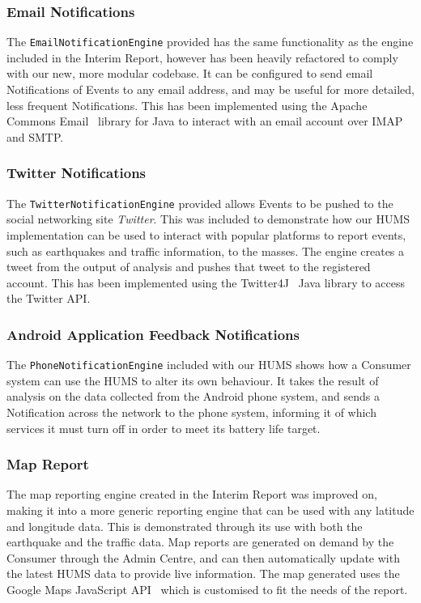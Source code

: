 \documentclass[10pt,a4paper]{article}
\begin{document}
\subsubsection{Email Notifications}
The \texttt{EmailNotificationEngine} provided has the same functionality as the engine included in the Interim Report, however has been heavily refactored to comply with our new, more modular codebase. It can be configured to send email Notifications of Events to any email address, and may be useful for more detailed, less frequent Notifications. This has been implemented using the Apache Commons Email~\cite{ac_email} library for Java to interact with an email account over IMAP and SMTP.

\subsubsection{Twitter Notifications}
The \texttt{TwitterNotificationEngine} provided allows Events to be pushed to the social networking site \emph{Twitter}. This was included to demonstrate how our HUMS implementation can be used to interact with popular platforms to report events, such as earthquakes and traffic information, to the masses. The engine creates a tweet from the output of analysis and pushes that tweet to the registered account. This has been implemented using the Twitter4J~\cite{twitter4j} Java library to access the Twitter API.

\subsubsection{Android Application Feedback Notifications}
The \texttt{PhoneNotificationEngine} included with our HUMS shows how a Consumer system can use the HUMS to alter its own behaviour. It takes the result of analysis on the data collected from the Android phone system, and sends a Notification across the network to the phone system, informing it of which services it must turn off in order to meet its battery life target.

\subsubsection{Map Report}
The map reporting engine created in the Interim Report was improved on, making it into a more generic reporting engine that can be used with any latitude and longitude data. This is demonstrated through its use with both the earthquake and the traffic data. Map reports are generated on demand by the Consumer through the Admin Centre, and can then automatically update with the latest HUMS data to provide live information. The map generated uses the Google Maps JavaScript API~\cite{g_maps} which is customised to fit the needs of the report.
\end{document}
